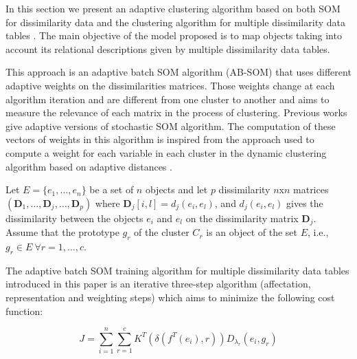 \documentclass[10pt, conference, compsocconf]{IEEEtran}
\begin{document}
In this section we present an adaptive clustering algorithm based on both SOM for dissimilarity data \cite{golli:2004} and the clustering algorithm for multiple dissimilarity data tables \cite{DeCarvalho:2011}. The main objective of the model proposed is to map objects taking into account its relational descriptions given by multiple dissimilarity data tables.

This approach is an adaptive batch SOM algorithm (AB-SOM) that uses different adaptive weights on the dissimilarities matrices. Those weights change at each algorithm iteration and are different from one cluster to another and aims to measure the relevance of each matrix in the process of clustering. Previous works \cite{Kangas:1990}  \cite{Grozavu:2009} give adaptive versions of stochastic SOM algorithm. The computation of these vectors of weights in this algorithm is inspired from the approach used to compute a weight for each variable in each cluster in the dynamic clustering algorithm based on adaptive distances \cite{Diday:1977}.

Let $E = \{e_1,\dots,e_n\}$ be a set of $n$ objects	and let $p$ dissimilarity $n$x$n$ matrices $(\textbf{D}_1, \dots, \textbf{D}_j, \dots, \textbf{D}_p)$ where $\textbf{D}_j[i,l] = d_j(e_i,e_l)$, and $d_j(e_i,e_l)$ gives the dissimilarity between the objects $e_i$ and $e_l$ on the dissimilarity matrix $\textbf{D}_j$. Assume that the prototype $g_r$ of the cluster $C_r$ is an object of the set $E$, i.e., $g_r \in E \: \forall r = 1,\dots, c$.

The adaptive batch SOM training algorithm for multiple dissimilarity data tables introduced in this paper is an iterative three-step algorithm (affectation, representation and weighting steps) which aims to minimize the following cost function:

\begin{equation}
J = \sum_{i=1}^n \sum_{r=1}^c K^T (\delta(f^T(e_i),r)) D_{\lambda_{r}}(e_i, g_r)
\label{cost_func_adaptive}
\end{equation}


\end{document}
